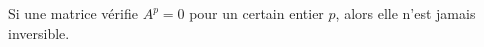 Si une matrice vérifie $A^p=0$ pour un certain entier $p$, alors elle n'est jamais inversible.

\begin{reponses}
\end{reponses}


